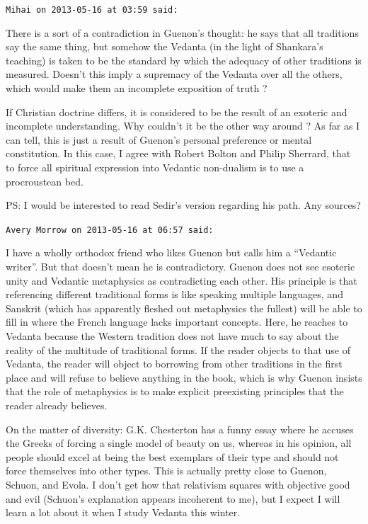 \begin{footnotesize}
\begin{sffamily}
\hfill

\texttt{Mihai on 2013-05-16 at 03:59 said:}

There is a sort of a contradiction in Guenon's thought: he says that all traditions say the same thing, but somehow the Vedanta (in the light of Shankara's teaching) is taken to be the standard by which the adequacy of other traditions is measured. Doesn't this imply a supremacy of the Vedanta over all the others, which would make them an incomplete exposition of truth ?

If Christian doctrine differs, it is considered to be the result of an exoteric and incomplete understanding. Why couldn't it be the other way around ? As far as I can tell, this is just a result of Guenon's personal preference or mental constitution. In this case, I agree with Robert Bolton and Philip Sherrard, that to force all spiritual expression into Vedantic non-dualism is to use a procroustean bed.

PS: I would be interested to read Sedir's version regarding his path. Any sources?

\hfill

\texttt{Avery Morrow on 2013-05-16 at 06:57 said:}

I have a wholly orthodox friend who likes Guenon but calls him a ``Vedantic writer''. But that doesn't mean he is contradictory. Guenon does not see esoteric unity and Vedantic metaphysics as contradicting each other. His principle is that referencing different traditional forms is like speaking multiple languages, and Sanskrit (which has apparently fleshed out metaphysics the fullest) will be able to fill in where the French language lacks important concepts. Here, he reaches to Vedanta because the Western tradition does not have much to say about the reality of the multitude of traditional forms. If the reader objects to that use of Vedanta, the reader will object to borrowing from other traditions in the first place and will refuse to believe anything in the book, which is why Guenon insists that the role of metaphysics is to make explicit preexisting principles that the reader already believes.

On the matter of diversity: G.K. Chesterton has a funny essay where he accuses the Greeks of forcing a single model of beauty on us, whereas in his opinion, all people should excel at being the best exemplars of their type and should not force themselves into other types. This is actually pretty close to Guenon, Schuon, and Evola. I don't get how that relativism squares with objective good and evil (Schuon's explanation appears incoherent to me), but I expect I will learn a lot about it when I study Vedanta this winter.


\end{sffamily}
\end{footnotesize}
